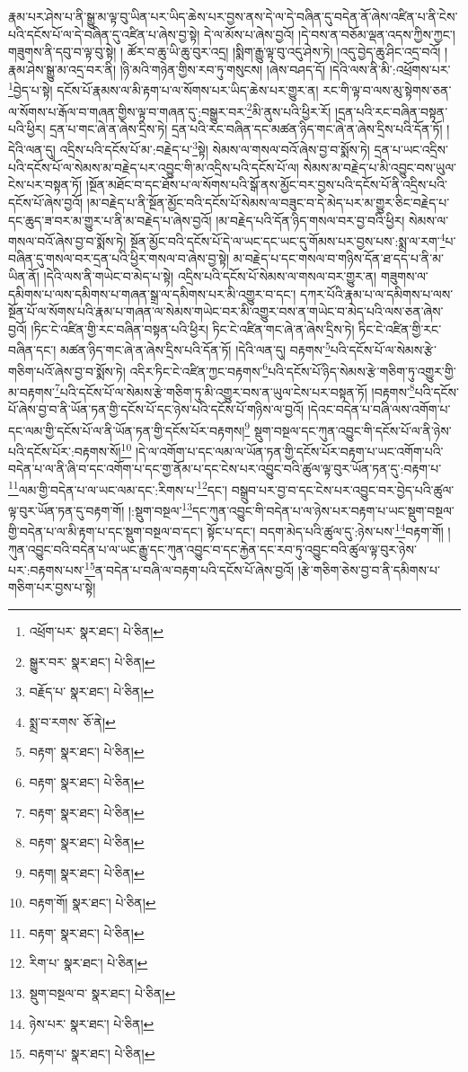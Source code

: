 རྣམ་པར་ཤེས་པ་ནི་སྒྱུ་མ་ལྟ་བུ་ཡིན་པར་ཡིད་ཆེས་པར་བྱས་ནས་དེ་ལ་དེ་བཞིན་དུ་བདེན་ནོ་ཞེས་འཛིན་པ་ནི་ངེས་པའི་དངོས་པོ་ལ་དེ་བཞིན་དུ་འཛིན་པ་ཞེས་བྱ་སྟེ། དེ་ལ་མོས་པ་ཞེས་བྱའོ། །དེ་བས་ན་བཅོམ་ལྡན་འདས་ཀྱིས་ཀྱང་། གཟུགས་ནི་དབུ་བ་ལྟ་བུ་སྟེ། །
ཚོར་བ་ཆུ་ཡི་ཆུ་བུར་འདྲ། །སྨིག་རྒྱུ་ལྟ་བུ་འདུ་ཤེས་ཏེ། །འདུ་བྱེད་ཆུ་ཤིང་འདྲ་བའོ། །རྣམ་ཤེས་སྒྱུ་མ་འདྲ་བར་ནི། །ཉི་མའི་གཉེན་གྱིས་རབ་ཏུ་གསུངས། །ཞེས་བཤད་དོ། །དེའི་ལས་ནི་མི་:འཕྲོགས་པར་\footnote{འཕྲོག་པར་  སྣར་ཐང་།  པེ་ཅིན། }བྱེད་པ་སྟེ། དངོས་པོ་རྣམས་ལ་མི་རྟག་པ་ལ་སོགས་པར་ཡིད་ཆེས་པར་གྱུར་ན། རང་གི་ལྟ་བ་ལས་མུ་སྟེགས་ཅན་ལ་སོགས་པ་རྒོལ་བ་གཞན་གྱིས་ལྟ་བ་གཞན་དུ་:བསྒྱུར་བར་\footnote{སྒྱུར་བར་  སྣར་ཐང་།  པེ་ཅིན། }མི་ནུས་པའི་ཕྱིར་རོ། །དྲན་པའི་རང་བཞིན་བསྟན་པའི་ཕྱིར། དྲན་པ་གང་ཞེ་ན་ཞེས་དྲིས་ཏེ། དྲན་པའི་རང་བཞིན་དང་མཚན་ཉིད་གང་ཞེ་ན་ཞེས་དྲིས་པའི་དོན་ཏོ། །དེའི་ལན་དུ། འདྲིས་པའི་དངོས་པོ་མ་:བརྗེད་པ་\footnote{བརྗོད་པ་  སྣར་ཐང་།  པེ་ཅིན། }སྟེ། སེམས་ལ་གསལ་བའོ་ཞེས་བྱ་བ་སྨོས་ཏེ། དྲན་པ་ཡང་འདྲིས་པའི་དངོས་པོ་ལ་སེམས་མ་བརྗེད་པར་འབྱུང་གི་མ་འདྲིས་པའི་དངོས་པོ་ལ། སེམས་མ་བརྗེད་པ་མི་འབྱུང་བས་ཡུལ་ངེས་པར་བསྟན་ཏོ། །སྔོན་མཐོང་བ་དང་ཐོས་པ་ལ་སོགས་པའི་སྒོ་ནས་མྱོང་བར་བྱས་པའི་དངོས་པོ་ནི་འདྲིས་པའི་དངོས་པོ་ཞེས་བྱའོ། །མ་བརྗེད་པ་ནི་སྔོན་མྱོང་བའི་དངོས་པོ་སེམས་ལ་བཟུང་བ་དེ་མེད་པར་མ་གྱུར་ཅིང་བརྗེད་པ་དང་ཆུད་ཟ་བར་མ་གྱུར་པ་ནི་མ་བརྗེད་པ་ཞེས་བྱའོ། །མ་བརྗེད་པའི་དོན་ཉིད་གསལ་བར་བྱ་བའི་ཕྱིར། སེམས་ལ་གསལ་བའོ་ཞེས་བྱ་བ་སྨོས་ཏེ། སྔོན་མྱོང་བའི་དངོས་པོ་དེ་ལ་ཡང་དང་ཡང་དུ་གོམས་པར་བྱས་པས་:སྨྲ་ལ་རག་\footnote{སྨྲ་བ་རགས་  ཅོ་ནེ། }པ་བཞིན་དུ་གསལ་བར་དྲན་པའི་ཕྱིར་གསལ་བ་ཞེས་བྱ་སྟེ། མ་བརྗེད་པ་དང་གསལ་བ་གཉིས་དོན་ཐ་དད་པ་ནི་མ་ཡིན་ནོ། །དེའི་ལས་ནི་གཡེང་བ་མེད་པ་སྟེ། འདྲིས་པའི་དངོས་པོ་སེམས་ལ་གསལ་བར་གྱུར་ན། གཟུགས་ལ་དམིགས་པ་ལས་དམིགས་པ་གཞན་སྒྲ་ལ་དམིགས་པར་མི་འགྱུར་བ་དང་། དཀར་པོའི་རྣམ་པ་ལ་དམིགས་པ་ལས་སྔོན་པོ་ལ་སོགས་པའི་རྣམ་པ་གཞན་ལ་སེམས་གཡེང་བར་མི་འགྱུར་བས་ན་གཡེང་བ་མེད་པའི་ལས་ཅན་ཞེས་བྱའོ། །ཏིང་ངེ་འཛིན་གྱི་རང་བཞིན་བསྟན་པའི་ཕྱིར། ཏིང་ངེ་འཛིན་གང་ཞེ་ན་ཞེས་དྲིས་ཏེ། ཏིང་ངེ་འཛིན་གྱི་རང་བཞིན་དང་། མཚན་ཉིད་གང་ཞེ་ན་ཞེས་དྲིས་པའི་དོན་ཏོ། །དེའི་ལན་དུ། བརྟགས་\footnote{བརྟག་  སྣར་ཐང་།  པེ་ཅིན། }པའི་དངོས་པོ་ལ་སེམས་རྩེ་གཅིག་པའོ་ཞེས་བྱ་བ་སྨོས་ཏེ། འདིར་ཏིང་ངེ་འཛིན་ཀྱང་བརྟགས་\footnote{བརྟག་  སྣར་ཐང་།  པེ་ཅིན། }པའི་དངོས་པོ་ཉིད་སེམས་རྩེ་གཅིག་ཏུ་འགྱུར་གྱི་མ་བརྟགས་\footnote{བརྟག་  སྣར་ཐང་།  པེ་ཅིན། }པའི་དངོས་པོ་ལ་སེམས་རྩེ་གཅིག་ཏུ་མི་འགྱུར་བས་ན་ཡུལ་ངེས་པར་བསྟན་ཏོ། །བརྟགས་\footnote{བརྟག་  སྣར་ཐང་།  པེ་ཅིན། }པའི་དངོས་པོ་ཞེས་བྱ་བ་ནི་ཡོན་ཏན་གྱི་དངོས་པོ་དང་ཉེས་པའི་དངོས་པོ་གཉིས་ལ་བྱའོ། །དེའང་བདེན་པ་བཞི་ལས་འགོག་པ་དང་ལམ་གྱི་དངོས་པོ་ལ་ནི་ཡོན་ཏན་གྱི་དངོས་པོར་བརྟགས།\footnote{བརྟག།  སྣར་ཐང་།  པེ་ཅིན། } སྡུག་བསྔལ་དང་ཀུན་འབྱུང་གི་དངོས་པོ་ལ་ནི་ཉེས་པའི་དངོས་པོར་:བརྟགས་སོ།\footnote{བརྟག་གོ།  སྣར་ཐང་།  པེ་ཅིན། } །དེ་ལ་འགོག་པ་དང་ལམ་ལ་ཡོན་ཏན་གྱི་དངོས་པོར་བརྟག་པ་ཡང་འགོག་པའི་བདེན་པ་ལ་ནི་ཞི་བ་དང་འགོག་པ་དང་གྱ་ནོམ་པ་དང་ངེས་པར་འབྱུང་བའི་ཚུལ་ལྟ་བུར་ཡོན་ཏན་དུ་:བརྟག་པ་\footnote{བརྟག་  སྣར་ཐང་།  པེ་ཅིན། }ལམ་གྱི་བདེན་པ་ལ་ཡང་ལམ་དང་:རིགས་པ་\footnote{རིག་པ་  སྣར་ཐང་།  པེ་ཅིན། }དང་། བསྒྲུབ་པར་བྱ་བ་དང་ངེས་པར་འབྱུང་བར་བྱེད་པའི་ཚུལ་ལྟ་བུར་ཡོན་ཏན་དུ་བརྟག་གོ། །:སྡུག་བསྔལ་\footnote{སྡུག་བསྔལ་བ་  སྣར་ཐང་།  པེ་ཅིན། }དང་ཀུན་འབྱུང་གི་བདེན་པ་ལ་ཉེས་པར་བརྟག་པ་ཡང་སྡུག་བསྔལ་གྱི་བདེན་པ་ལ་མི་རྟག་པ་དང་སྡུག་བསྔལ་བ་དང་། སྟོང་པ་དང་། བདག་མེད་པའི་ཚུལ་དུ་:ཉེས་པས་\footnote{ཉེས་པར་  སྣར་ཐང་།  པེ་ཅིན། }བརྟག་གོ། །ཀུན་འབྱུང་བའི་བདེན་པ་ལ་ཡང་རྒྱུ་དང་ཀུན་འབྱུང་བ་དང་རྐྱེན་དང་རབ་ཏུ་འབྱུང་བའི་ཚུལ་ལྟ་བུར་ཉེས་པར་:བརྟགས་པས་\footnote{བརྟག་པ་  སྣར་ཐང་།  པེ་ཅིན། }ན་བདེན་པ་བཞི་ལ་བརྟག་པའི་དངོས་པོ་ཞེས་བྱའོ། །རྩེ་གཅིག་ཅེས་བྱ་བ་ནི་དམིགས་པ་གཅིག་པར་བྱས་པ་སྟེ། 